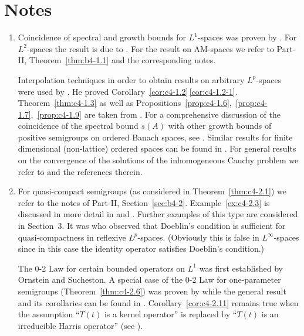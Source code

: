 \section*{Notes}
\begin{enumerate}[label=\emph{Section \arabic*:}, wide, itemsep=1ex]

\item%
Coincidence of spectral and growth bounds for $L^{1}$-spaces was proven by \textcite{derndinger:1980}.
For $L^{2}$-spaces the result is due to \textcite{greinernagel:1983}.
For the result on AM-spaces we refer to 
Part-II, Theorem~\ref{thm:b4-1.1} and the corresponding notes.

Interpolation techniques in order to obtain results on arbitrary $L^{p}$-spaces were used by \textcite{voigt:1985}.
He proved Corollary~\ref{cor:c4-1.2}\,\ref{cor:c4-1.2-1}.
Theorem~\ref{thm:c4-1.3} as well as Propositions~\ref{prop:c4-1.6},~\ref{prop:c4-1.7},~\ref{prop:c4-1.9}  are taken from \textcite{neubrander:1985a}.
For a comprehensive discussion of the coincidence of the spectral bound $s(A)$ with other growth bounds of positive semigroups on ordered Banach spaces, see \textcite{klein:1984}.
Similar results for finite dimensional (non-lattice) ordered spaces can be found in \textcite{stern:1982}.
For general results on the convergence of the solutions of the inhomogeneous Cauchy problem we refer to \textcite{pazy:1983} and the references therein.

\item%
For quasi-compact semigroups (as considered in Theorem~\ref{thm:c4-2.1}) we refer to the notes of Part-II, Section~\ref{sec:b4-2}.
Example~\ref{ex:c4-2.3} is discussed in more detail in \textcite{webb:1984} and \textcite{greiner:1984}.
Further examples of this type are considered in Section~3.
It was \textcite{lotz:1986} who observed that Doeblin's condition is sufficient for quasi-com\-pactness in reflexive $L^{p}$-spaces.
(Obviously this is false in $L^{\infty}$-spaces since in this case the identity operator satisfies Doeblin's condition.)

The 0-2 Law for certain bounded operators on $L^{1}$ was first established by Ornstein and Sucheston.
A special case of the 0-2 Law for one-parameter semigroups (Theorem~\ref{thm:c4-2.6}) was proven by \textcite{winkler:1972} while the general result and its corollaries can be found in \textcite{greiner:1982}.
Corollary~\ref{cor:c4-2.11} remains true when the assumption \enquote{$T(t)$ is a kernel operator} is replaced by \enquote{$T(t)$ is an irreducible Harris operator} (see \textcite{lin:1974}).


\end{enumerate}
